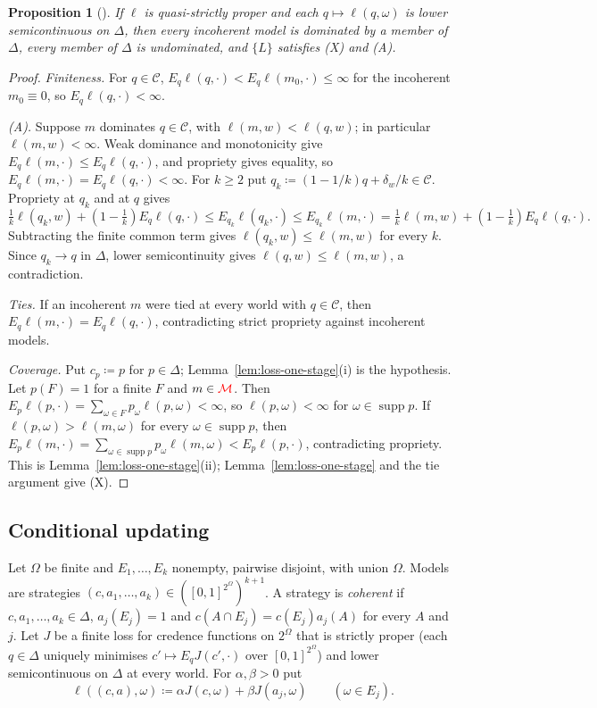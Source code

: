 \documentclass[11pt]{article}
\newcommand{\chg}[1]{{\color{red}#1}}
\newtheorem{proposition}[theorem]{Proposition}
\theoremstyle{definition}
\theoremstyle{remark}
\newcommand{\M}{\mathcal M}
\newcommand{\C}{\mathcal C}
\newcommand{\supp}{\operatorname{supp}}
\begin{document}
\begin{proposition}[{\cite{Nielsen2023}}]\label{prop:probabilism}
If $\ell$ is quasi-strictly proper and each $q\mapsto\ell(q,\omega)$ is lower semicontinuous on $\Delta$, then every incoherent model is dominated by a member of $\Delta$, every member of $\Delta$ is undominated, and $\{L\}$ satisfies \chg{(X) and (A)}.
\end{proposition}
\begin{proof}
\emph{Finiteness.} For $q\in\C$, $E_q\ell(q,\cdot)<E_q\ell(m_0,\cdot)\le\infty$ for the incoherent $m_0\equiv0$, so $E_q\ell(q,\cdot)<\infty$.

\emph{(A).} Suppose $m$ dominates $q\in\C$, with $\ell(m,w)<\ell(q,w)$; in particular $\ell(m,w)<\infty$. Weak dominance and monotonicity give $E_q\ell(m,\cdot)\le E_q\ell(q,\cdot)$, and propriety gives equality, so $E_q\ell(m,\cdot)=E_q\ell(q,\cdot)<\infty$. For $k\ge2$ put $q_k\coloneqq(1-1/k)q+\delta_w/k\in\C$. Propriety at $q_k$ and at $q$ gives
\[
\tfrac1k\ell(q_k,w)+(1-\tfrac1k)E_q\ell(q,\cdot)\le E_{q_k}\ell(q_k,\cdot)\le E_{q_k}\ell(m,\cdot)=\tfrac1k\ell(m,w)+(1-\tfrac1k)E_q\ell(q,\cdot).
\]
Subtracting the finite common term gives $\ell(q_k,w)\le\ell(m,w)$ for every $k$. Since $q_k\to q$ in $\Delta$, lower semicontinuity gives $\ell(q,w)\le\ell(m,w)$, a contradiction.

\emph{Ties.} If an incoherent $m$ were tied at every world with $q\in\C$, then $E_q\ell(m,\cdot)=E_q\ell(q,\cdot)$, contradicting strict propriety against incoherent models.

\emph{Coverage.} Put $c_p\coloneqq p$ for $p\in\Delta$; Lemma~\ref{lem:loss-one-stage}(i) is the hypothesis. Let $p(F)=1$ for a finite $F$ and $m\in\chg{\M}$. Then $E_p\ell(p,\cdot)=\sum_{\omega\in F}p_\omega\ell(p,\omega)<\infty$, so $\ell(p,\omega)<\infty$ for $\omega\in\supp p$. If $\ell(p,\omega)>\ell(m,\omega)$ for every $\omega\in\supp p$, then $E_p\ell(m,\cdot)=\sum_{\omega\in\supp p}p_\omega\ell(m,\omega)<E_p\ell(p,\cdot)$, contradicting propriety. This is Lemma~\ref{lem:loss-one-stage}(ii); Lemma~\ref{lem:loss-one-stage} and the tie argument give (X).
\end{proof}

\subsection{Conditional updating}

Let $\Omega$ be finite and $E_1,\dots,E_k$ nonempty, pairwise disjoint, with union $\Omega$. Models are strategies $(c,a_1,\dots,a_k)\in([0,1]^{2^\Omega})^{k+1}$. A strategy is \emph{coherent} if $c,a_1,\dots,a_k\in\Delta$, $a_j(E_j)=1$ and $c(A\cap E_j)=c(E_j)a_j(A)$ for every $A$ and $j$. Let $J$ be a finite loss for credence functions on $2^\Omega$ that is strictly proper (each $q\in\Delta$ uniquely minimises $c'\mapsto E_qJ(c',\cdot)$ over $[0,1]^{2^\Omega}$) and lower semicontinuous on $\Delta$ at every world. For $\alpha,\beta>0$ put
\[
\ell((c,a),\omega)\coloneqq\alpha J(c,\omega)+\beta J(a_j,\omega)\qquad(\omega\in E_j).
\]
\end{document}
